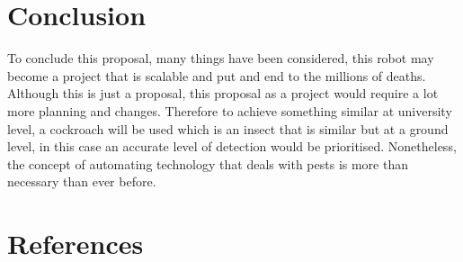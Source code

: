 \documentclass[11pt]{article}
\begin{document}
	

	
	
	

	
	
	\section{Conclusion}
	
	
To conclude this proposal, many things have been considered, this robot may become a project that is scalable and put and end to the millions of deaths. Although this is just a proposal, this proposal as a project would require a lot more planning and changes. Therefore to achieve something similar at university level, a cockroach will be used which is an insect that is similar but at a ground level, in this case an accurate level of detection would be prioritised. Nonetheless, the concept of automating technology that deals with pests is more than necessary than ever before. 

	\section{References }
	
	\renewcommand{\bibsection}{}
	
	
	
	
	
	
	
	
\end{document}

